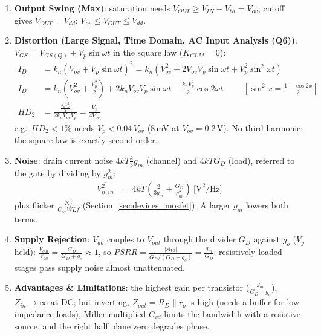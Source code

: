 \begin{enumerate}
    \paragraph{At Output:} \(V_{in} = 0\) and (low frequency) \(V_g = 0\), so \(g_m V_g = 0\). Test
    voltage \(V_{test}\) at the output:
    \begin{align*}
      I_{test} &= V_{test} G_D + V_{test} g_o + g_m \cdot 0 = V_{test}(G_D + g_o) \hspace{1cm} \Rightarrow \hspace{1cm}
      Z_{out} = \frac{1}{G_D + g_o} = R_D \parallel r_o
    \end{align*}
  \item \textbf{Output Swing (Max)}: saturation needs \(V_{OUT} \geq V_{IN} - V_{th} = V_{ov}\);
    cutoff gives \(V_{OUT} = V_{dd}\): \(V_{ov} \leq V_{OUT} \leq V_{dd}\).
  \item \textbf{Distortion (Large Signal, Time Domain, AC Input Analysis (Q6))}: \(V_{GS} = V_{GS(Q)} + V_p\sin\omega t\)
    in the square law (\(K_{CLM} = 0\)):
    \begin{align*}
      I_D &= k_n (V_{ov} + V_p\sin\omega t)^2 = k_n\left(V_{ov}^2 + 2V_{ov}V_p\sin\omega t + V_p^2\sin^2\omega t\right) \\
      I_D &= k_n\left(V_{ov}^2 + \frac{V_p^2}{2}\right) + 2k_n V_{ov}V_p\sin\omega t - \frac{k_n V_p^2}{2}\cos 2\omega t \hspace{1cm} [\sin^2 x = \tfrac{1 - \cos 2x}{2}] \\
      HD_2 &= \frac{\frac{k_n V_p^2}{2}}{2k_n V_{ov}V_p} = \frac{V_p}{4V_{ov}}
    \end{align*}
    e.g.\ \(HD_2 < 1\%\) needs \(V_p < 0.04\,V_{ov}\) (\(8\,\)mV at \(V_{ov} = 0.2\,\)V). No third harmonic: the square law is
    exactly second order.
  \item \textbf{Noise}: drain current noise \(4kT\frac{2}{3}g_m\) (channel) and \(4kTG_D\) (load), referred to the
    gate by dividing by \(g_m^2\):
    \begin{align*}
      \overline{V_{n,in}^2} &= 4kT\left(\frac{2}{3g_m} + \frac{G_D}{g_m^2}\right) \ \text{[V}^2\text{/Hz]}
    \end{align*}
    plus flicker \(\frac{K_f}{C_{ox}WLf}\) (Section~\ref{sec:devices_mosfet}). A larger \(g_m\) lowers both terms.
  \item \textbf{Supply Rejection}: \(V_{dd}\) couples to \(V_{out}\) through the divider \(G_D\) against \(g_o\)
    (\(V_g\) held): \(\frac{V_{out}}{V_{dd}} = \frac{G_D}{G_D + g_o} \approx 1\), so \(PSRR = \frac{|A_{V0}|}{G_D/(G_D + g_o)} = \frac{g_m}{G_D}\):
    resistively loaded stages pass supply noise almost unattenuated.
  \item \textbf{Advantages \& Limitations}: the highest gain per transistor
    (\(\frac{g_m}{G_D + g_o}\)), \(Z_{in} \to \infty\) at DC; but inverting, \(Z_{out} = R_D \parallel r_o\)
    is high (needs a buffer for low impedance loads), Miller multiplied \(C_{gd}\) limits the
    bandwidth with a resistive source, and the right half plane zero degrades phase.
\end{enumerate}

